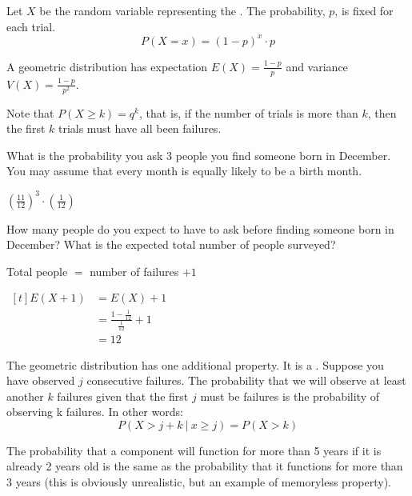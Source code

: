 \begin{definition}
    Let $X$ be the random variable representing the . The probability, $p$, is fixed for each trial.
    $$P(X = x) = (1 - p)^x \cdot p$$

    A geometric distribution has expectation $E(X) = \frac{1 - p}{p}$ and variance $V(X) = \frac{1 - p}{p^2}$. 
\end{definition}

Note that $P(X \ge k) = q^k$, that is, if the number of trials is more than $k$, then the first $k$ trials must have all been failures. 

\begin{example}
    What is the probability you ask $3$ people  you find someone born in December. You may assume that every month is equally likely to be a birth month.

    $\left( \frac{11}{12} \right)^3 \cdot \left( \frac{1}{12} \right)$

    How many people do you expect to have to ask before finding someone born in December? What is the expected total number of people surveyed?

    Total people $=$ number of failures $+ 1$

    $\begin{aligned}[t]
        E(X + 1) & = E(X) + 1 \\
                 & = \frac{1 - \frac{1}{12}}{\frac{1}{12}} + 1 \\
                 & = 12
    \end{aligned}$
\end{example}

\begin{definition}
    The geometric distribution has one additional property. It is a . Suppose you have observed $j$ consecutive failures. The probability that we will observe at least another $k$ failures given that the first $j$ must be failures is the probability of observing k failures. In other words: $$P(X > j + k ~|~ x \ge j) = P(X > k)$$
\end{definition}

\begin{example}
    The probability that a component will function for more than 5 years if it is already 2 years old is the same as the probability that it functions for more than 3 years (this is obviously unrealistic, but an example of memoryless property).
\end{example}

